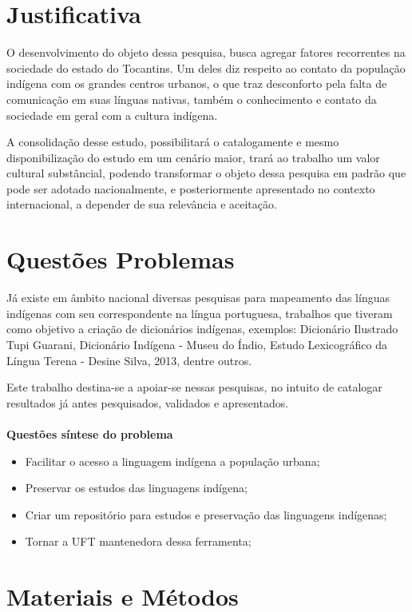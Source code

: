 \documentclass[journal]{IEEEtran}
\begin{document}
\section{Justificativa}

O desenvolvimento do objeto dessa pesquisa, busca agregar fatores recorrentes na sociedade do estado do Tocantins. Um deles diz respeito ao contato da população indígena com os grandes centros urbanos, o que traz desconforto pela falta de comunicação em suas línguas nativas, também o conhecimento e contato da sociedade em geral com a cultura indígena.

A consolidação desse estudo, possibilitará o catalogamente e mesmo disponibilização do estudo em um cenário maior, trará ao trabalho um valor cultural substâncial, podendo transformar o objeto dessa pesquisa em padrão que pode ser adotado nacionalmente, e posteriormente apresentado no contexto internacional, a depender de sua relevância e aceitação.

\section{Questões Problemas}

Já existe em âmbito nacional diversas pesquisas para mapeamento das línguas indígenas com seu correspondente na língua portuguesa, trabalhos que tiveram como objetivo a criação de dicionários indígenas, exemplos: Dicionário Ilustrado Tupi Guarani, Dicionário Indígena - Museu do Índio, Estudo Lexicográfico da Língua Terena - Desine Silva, 2013, dentre outros.

Este trabalho destina-se a apoiar-se nessas pesquisas, no intuito de catalogar resultados já antes pesquisados, validados e apresentados.
\\
\\
{\bf Questões síntese do problema}

\begin{itemize}
    \item Facilitar o acesso a linguagem indígena a população urbana;
    \item Preservar os estudos das linguagens indígena;
    \item Criar um repositório para estudos e preservação das linguagens indígenas;
    \item Tornar a UFT mantenedora dessa ferramenta;
\end{itemize}

\section{Materiais e Métodos}
\end{document}
